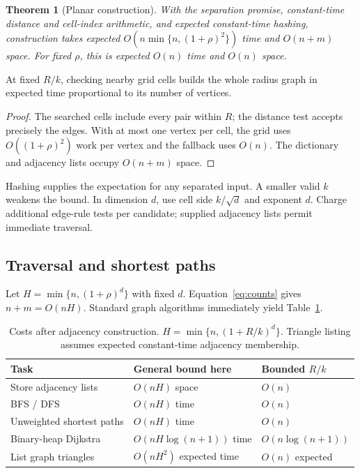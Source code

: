 \documentclass[11pt]{article}
\newtheorem{theorem}{Theorem}
\begin{document}
\begin{theorem}[Planar construction]\label{thm:grid}
With the separation promise, constant-time distance and cell-index
arithmetic, and expected constant-time hashing, construction takes expected
$O(n\min\{n,(1+\rho)^2\})$ time and $O(n+m)$ space.
For fixed $\rho$, this is expected $O(n)$ time
and $O(n)$ space.
\end{theorem}
\begin{takeaway}
At fixed $R/k$, checking nearby grid cells builds the whole radius graph
in expected time proportional to its number of vertices.
\end{takeaway}

\begin{proof}
The searched cells include every pair within $R$; the distance test
accepts precisely the edges. With at most one vertex per cell, the grid
uses $O((1+\rho)^2)$ work per vertex and the fallback uses $O(n)$.
The dictionary and adjacency lists occupy $O(n+m)$ space.
\end{proof}

Hashing supplies the expectation for any separated input. A smaller valid
$k$ weakens the bound. In dimension $d$, use cell side $k/\sqrt d$ and
exponent $d$. Charge additional edge-rule tests per candidate; supplied
adjacency lists permit immediate traversal.

\subsection{Traversal and shortest paths}
Let $H=\min\{n,(1+\rho)^d\}$ with fixed $d$. Equation~\eqref{eq:counts}
gives $n+m=O(nH)$. Standard graph algorithms immediately yield
Table~\ref{tab:costs}.

\begin{table}[tbp]
\centering\small
\begin{tabular}{lll}
\toprule
Task & General bound here & Bounded $R/k$\\
\midrule
Store adjacency lists & $O(nH)$ space & $O(n)$\\
BFS / DFS & $O(nH)$ time & $O(n)$\\
Unweighted shortest paths & $O(nH)$ time & $O(n)$\\
Binary-heap Dijkstra & $O(nH\log(n+1))$ time & $O(n\log(n+1))$\\
List graph triangles & $O(nH^2)$ expected time & $O(n)$ expected\\
\bottomrule
\end{tabular}
\caption{Costs after adjacency construction. $H=\min\{n,(1+R/k)^d\}$.
Triangle listing assumes expected constant-time adjacency membership.}
\label{tab:costs}
\end{table}
\end{document}
